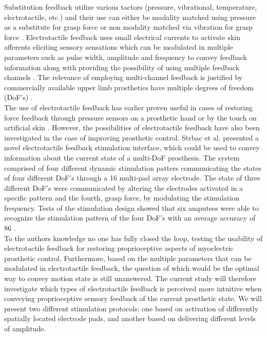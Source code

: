 Substitution feedback utilize various tactors (pressure, vibrational, temperature, electrotactile, etc.) and their use can either be modality matched using pressure as a substitute for grasp force \cite{Godfrey2017} or non modality matched via vibration for grasp force \cite{Ninu2014,Nabeel2016}. 
Electrotactile feedback uses small electrical currents to activate skin afferents eliciting sensory sensations which can be modulated in multiple parameters such as pulse width, amplitude and frequency to convey feedback information along with providing the possibility of using multiple feedback channels \cite{Geng2012}. The relevance of employing multi-channel feedback is justified by commercially available upper limb prosthetics have multiple degrees of freedom (DoF's) \cite{Cordella2016}. \\
%
The use of electrotactile feedback has earlier proven useful in cases of restoring force feedback through pressure sensors on a prosthetic hand or by the touch on artificial skin \cite{Hartmann2014,Franceschi2015}. However, the possibilities of electrotactile feedback have also been investigated in the case of improving prosthetic control. Strbac et al. \cite{Strbac2016} presented a novel electrotactile feedback stimulation interface, which could be used to convey information about the current state of a multi-DoF prosthesis. The system comprised of four different dynamic stimulation patters communicating the states of four different DoF's through a 16 multi-pad array electrode. The state of three different DoF's were communicated by altering the electrodes activated in a specific pattern and the fourth, grasp force, by modulating the stimulation frequency. Tests of the stimulation design showed that six amputees were able to recognize the stimulation pattern of the four DoF's with an average accuracy of 86 \percent. \cite{Strbac2016} \\   
%
To the authors knowledge no one has fully closed the loop, testing the usability of electrotactile feedback for restoring proprioceptive aspects of myoelectric prosthetic control. Furthermore, based on the multiple parameters that can be modulated in electrotactile feedback, the question of which would be the optimal way to convey motion state is still unanswered. The current study will therefore investigate which types of electrotactile feedback is perceived more intuitive when conveying proprioceptive sensory feedback of the current prosthetic state. We will present two different stimulation protocols; one based on activation of differently spatially located electrode pads, and another based on delivering different levels of amplitude.      


 
